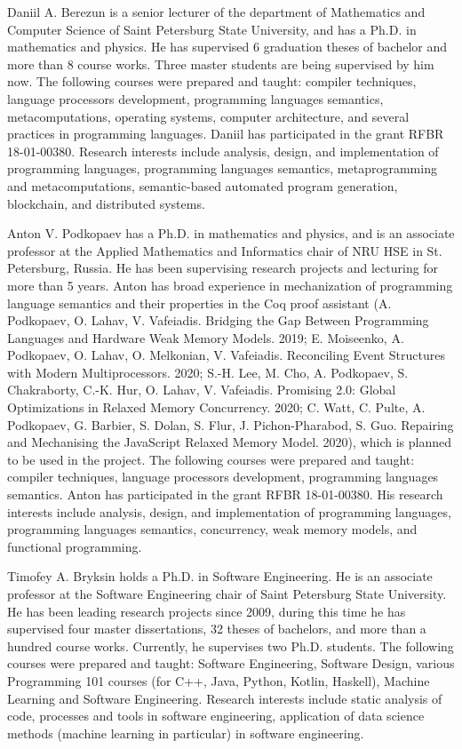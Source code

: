 \documentclass[12pt]{article}  %
\theoremstyle{remark}
\begin{document}
Daniil A. Berezun is a senior lecturer of the department of Mathematics and Computer Science of Saint Petersburg State University, and has a Ph.D. in mathematics and physics. He has supervised 6 graduation theses of bachelor and more than 8 course works. Three master students are being supervised by him now. The following courses were prepared and taught: compiler techniques, language processors development, programming languages semantics, metacomputations, operating systems, computer architecture, and several practices in programming languages. Daniil has participated in the grant RFBR 18-01-00380. Research interests include analysis, design, and implementation of programming languages, programming languages semantics, metaprogramming and metacomputations, semantic-based automated program generation, blockchain, and distributed systems.

Anton V. Podkopaev has a Ph.D. in mathematics and physics, and is an associate professor at the Applied Mathematics and Informatics chair of NRU HSE in St. Petersburg, Russia. He has been supervising research projects and lecturing for more than 5 years. Anton has broad experience in mechanization of programming language semantics and their properties in the Coq proof assistant (A. Podkopaev, O. Lahav, V. Vafeiadis. Bridging the Gap Between Programming Languages and Hardware Weak Memory Models. 2019; E. Moiseenko, A. Podkopaev, O. Lahav, O. Melkonian, V. Vafeiadis. Reconciling Event Structures with Modern Multiprocessors. 2020; S.-H. Lee, M. Cho, A. Podkopaev, S. Chakraborty, C.-K. Hur, O. Lahav, V. Vafeiadis. Promising 2.0: Global Optimizations in Relaxed Memory Concurrency. 2020; C. Watt, C. Pulte, A. Podkopaev, G. Barbier, S. Dolan, S. Flur, J. Pichon-Pharabod, S. Guo. Repairing and Mechanising the JavaScript Relaxed Memory Model. 2020),
which is planned to be used in the project. The following courses were prepared and taught: compiler techniques, language processors development, programming languages semantics. Anton has participated in the grant RFBR 18-01-00380. His research interests include analysis, design, and implementation of programming languages, programming languages semantics, concurrency, weak memory models, and functional programming.

Timofey A. Bryksin holds a Ph.D. in Software Engineering. He is an associate professor at the Software Engineering chair of Saint Petersburg State University. He has been leading research projects since 2009, during this time he has supervised four master dissertations, 32 theses of bachelors, and more than a hundred course works. Currently, he supervises two Ph.D. students. The following courses were prepared and taught: Software Engineering, Software Design, various Programming 101 courses (for C++, Java, Python, Kotlin, Haskell), Machine Learning and Software Engineering. Research interests include static analysis of code, processes and tools in software engineering, application of data science methods (machine learning in particular) in software engineering.
\end{document}
